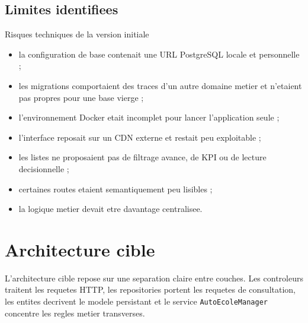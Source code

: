 \documentclass[11pt,a4paper]{article}
\newenvironment{compactitem}{\begin{itemize}[leftmargin=1.2em,itemsep=3pt,topsep=2pt]}{\end{itemize}}
\begin{document}
\subsection{Limites identifiees}

\begin{warningbox}{Risques techniques de la version initiale}
\begin{compactitem}
  \item la configuration de base contenait une URL PostgreSQL locale et personnelle ;
  \item les migrations comportaient des traces d'un autre domaine metier et n'etaient pas propres pour une base vierge ;
  \item l'environnement Docker etait incomplet pour lancer l'application seule ;
  \item l'interface reposait sur un CDN externe et restait peu exploitable ;
  \item les listes ne proposaient pas de filtrage avance, de KPI ou de lecture decisionnelle ;
  \item certaines routes etaient semantiquement peu lisibles ;
  \item la logique metier devait etre davantage centralisee.
\end{compactitem}
\end{warningbox}

\section{Architecture cible}

L'architecture cible repose sur une separation claire entre couches. Les controleurs traitent les requetes HTTP, les repositories portent les requetes de consultation, les entites decrivent le modele persistant et le service \texttt{AutoEcoleManager} concentre les regles metier transverses.
\end{document}

